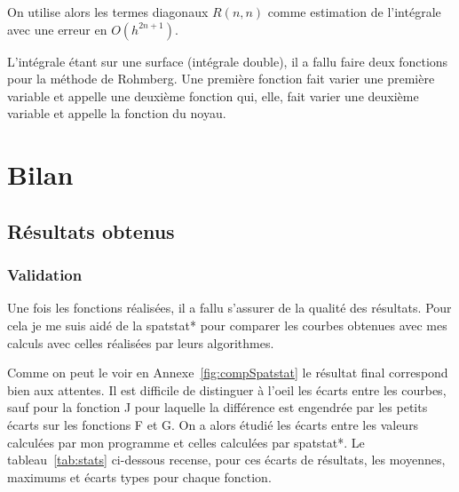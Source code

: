 \documentclass[stage2a]{tnreport}
\begin{document}
On utilise alors les termes diagonaux $R(n,n)$ comme estimation de l'intégrale avec une erreur en $O(h^{2n+1})$.

L'intégrale étant sur une surface (intégrale double), il a fallu faire deux fonctions pour la méthode de Rohmberg. Une première fonction fait varier une première variable et appelle une deuxième fonction qui, elle, fait varier une deuxième variable et appelle la fonction du noyau.


\chapter{Bilan}

\section{Résultats obtenus}

\subsection{Validation}

Une fois les fonctions réalisées, il a fallu s'assurer de la qualité des résultats. Pour cela je me suis aidé de la \gls{spatstat}* pour comparer les courbes obtenues avec mes calculs avec celles réalisées par leurs algorithmes.

Comme on peut le voir en Annexe~\ref{fig:compSpatstat} le résultat final correspond bien aux attentes. Il est difficile de distinguer à l'oeil les écarts entre les courbes, sauf pour la fonction J pour laquelle la différence est engendrée par les petits écarts sur les fonctions F et G. On a alors étudié les écarts entre les valeurs calculées par mon programme et celles calculées par \gls{spatstat}*. Le tableau~\ref{tab:stats} ci-dessous recense, pour ces écarts de résultats, les moyennes, maximums et écarts types pour chaque fonction.
\end{document}
